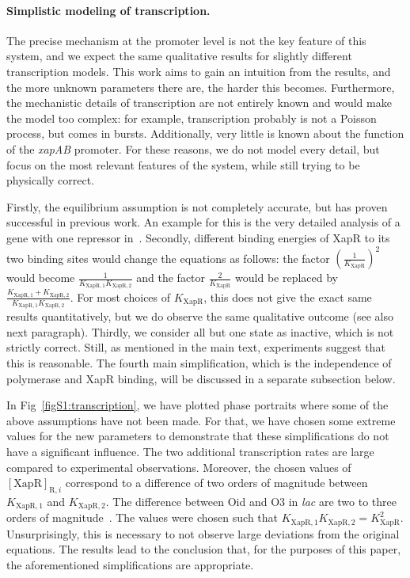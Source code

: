 \documentclass[10pt,letterpaper]{article}
\newcommand{\n}[1]{\mathrm{#1}}
\begin{document}
\paragraph*{Simplistic modeling of transcription.} The precise mechanism at the promoter level is not the key feature of this system, and we expect the same qualitative results for slightly different transcription models. This work aims to gain an intuition from the results, and the more unknown parameters there are, the harder this becomes. Furthermore, the mechanistic details of transcription are not entirely known and would make the model too complex: for example, transcription probably is not a Poisson process, but comes in bursts. Additionally, very little is known about the function of the \emph{xapAB} promoter. For these reasons, we do not model every detail, but focus on the most relevant features of the system, while still trying to be physically correct.

Firstly, the equilibrium assumption is not completely accurate, but has proven successful in previous work. An example for this is the very detailed analysis of a gene with one repressor in~\cite{Phillips2018}. Secondly, different binding energies of XapR to its two binding sites would change the equations as follows: the factor $\left(\frac{1}{K_{\n{XapR}}}\right)^2$ would become $\frac{1}{K_{\n{XapR,1}} K_{\n{XapR,2}}}$ and the factor $\frac{2}{K_{\n{XapR}}}$ would be replaced by $\frac{K_{\n{XapR,1}} + K_{\n{XapR,2}}}{K_{\n{XapR,1}} K_{\n{XapR,2}}}$. For most choices of $K_{\n{XapR}}$, this does not give the exact same results quantitatively, but we do observe the same qualitative outcome (see also next paragraph). Thirdly, we consider all but one state as inactive, which is not strictly correct. Still, as mentioned in the main text, experiments suggest that this is reasonable. The fourth main simplification, which is the independence of polymerase and XapR binding, will be discussed in a separate subsection below.

In Fig~\ref{figS1:transcription}, we have plotted phase portraits where some of the above assumptions have not been made. For that, we have chosen some extreme values for the new parameters to demonstrate that these simplifications do not have a significant influence. The two additional transcription rates are large compared to experimental observations. Moreover, the chosen values of $\n{[XapR]}_{\n{R},i}$ correspond to a difference of two orders of magnitude between $K_{\n{XapR,1}}$ and $K_{\n{XapR,2}}$. The difference between Oid and O3 in \emph{lac} are two to three orders of magnitude~\cite{RazoMejia2018}. The values were chosen such that $K_{\n{XapR,1}} K_{\n{XapR,2}} = K_{\n{XapR}}^2$. Unsurprisingly, this is necessary to not observe large deviations from the original equations. The results lead to the conclusion that, for the purposes of this paper, the aforementioned simplifications are appropriate.
\end{document}
